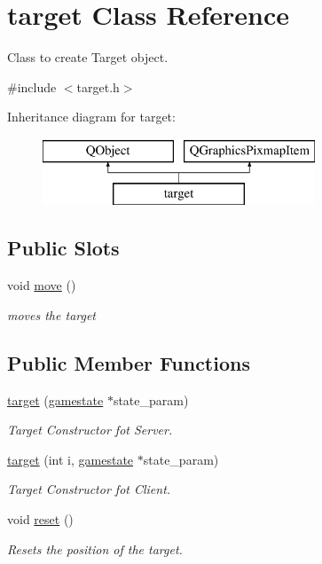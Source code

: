 \hypertarget{classtarget}{}\section{target Class Reference}
\label{classtarget}


Class to create Target object.  




{\ttfamily \#include $<$target.\+h$>$}

Inheritance diagram for target\+:\begin{figure}[H]
\begin{center}
\leavevmode
\includegraphics[height=2.000000cm]{classtarget}
\end{center}
\end{figure}
\subsection*{Public Slots}
\begin{DoxyCompactItemize}
\item 
\mbox{\label{classtarget_a7ae097b44b076496d3a99ecd81bcc2e1}} 
void \hyperlink{classtarget_a7ae097b44b076496d3a99ecd81bcc2e1}{move} ()
\begin{DoxyCompactList}\small\item\em moves the target \end{DoxyCompactList}\end{DoxyCompactItemize}
\subsection*{Public Member Functions}
\begin{DoxyCompactItemize}
\item 
\hyperlink{classtarget_a26ebddd755f8b29136be39b59b474b50}{target} (\hyperlink{classgamestate}{gamestate} $\ast$state\+\_\+param)
\begin{DoxyCompactList}\small\item\em Target Constructor fot Server. \end{DoxyCompactList}\item 
\hyperlink{classtarget_a091e064f965676275a1e86b09c3604b4}{target} (int i, \hyperlink{classgamestate}{gamestate} $\ast$state\+\_\+param)
\begin{DoxyCompactList}\small\item\em Target Constructor fot Client. \end{DoxyCompactList}\item 
\mbox{\label{classtarget_a0d7ed50b67b1cacf5a7dc369b0b8c06d}} 
void \hyperlink{classtarget_a0d7ed50b67b1cacf5a7dc369b0b8c06d}{reset} ()
\begin{DoxyCompactList}\small\item\em Resets the position of the target. \end{DoxyCompactList}\end{DoxyCompactItemize}
